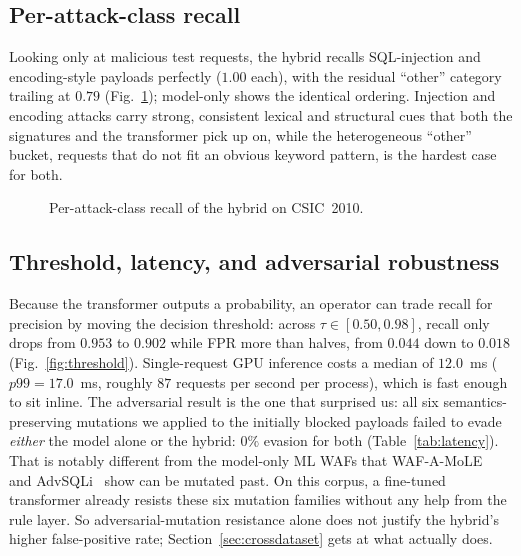 \documentclass[conference]{IEEEtran}
\begin{document}
\subsection{Per-attack-class recall}
Looking only at malicious test requests, the hybrid recalls
SQL-injection and encoding-style payloads perfectly ($1.00$ each), with
the residual ``other'' category trailing at $0.79$
(Fig.~\ref{fig:perclass}); model-only shows the identical ordering.
Injection and encoding attacks carry strong, consistent lexical and
structural cues that both the signatures and the transformer pick up
on, while the heterogeneous ``other'' bucket, requests that do not fit
an obvious keyword pattern, is the hardest case for both.

\begin{figure}[t]
\centering
{}
\caption{Per-attack-class recall of the hybrid on CSIC~2010.}
\label{fig:perclass}
\end{figure}

\subsection{Threshold, latency, and adversarial robustness}
Because the transformer outputs a probability, an operator can trade
recall for precision by moving the decision threshold: across
$\tau\in[0.50,0.98]$, recall only drops from $0.953$ to $0.902$ while
FPR more than halves, from $0.044$ down to $0.018$
(Fig.~\ref{fig:threshold}). Single-request GPU inference costs a median
of $12.0$~ms ($p99{=}17.0$~ms, roughly $87$ requests per second per
process), which is fast enough to sit inline. The adversarial result is
the one that surprised us: all six semantics-preserving mutations we
applied to the initially blocked payloads failed to evade \emph{either}
the model alone or the hybrid: $0\%$ evasion for both
(Table~\ref{tab:latency}). That is notably different from the
model-only ML WAFs that WAF-A-MoLE~\cite{demetrio2020wafamole} and
AdvSQLi~\cite{advsqli2024} show can be mutated past. On this corpus, a
fine-tuned transformer already resists these six mutation families
without any help from the rule layer. So adversarial-mutation
resistance alone does not justify the hybrid's higher false-positive
rate; Section~\ref{sec:crossdataset} gets at what actually does.
\end{document}
